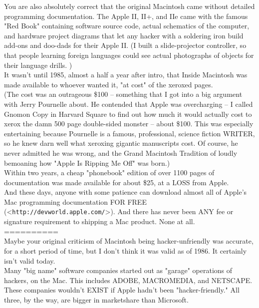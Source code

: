 \documentclass[11pt,twoside,a4paper]{article}
\begin{document}
\begin{multicols*}{2}
You are also absolutely correct that the original Macintosh came without detailed programming documentation. The Apple II, II+, and IIe came with the famous "Red Book" containing software source code, actual schematics of the computer, and hardware project diagrams that let any hacker with a soldering iron build add-ons and doo-dads for their Apple II. (I built a slide-projector controller, so that people learning foreign languages could see actual photographs of objects for their language drills. )~\\

It wasn't until 1985, almost a half a year after intro, that Inside Macintosh was made available to whoever wanted it, "at cost" of the xeroxed pages.~\\

(The cost was an outrageous \$100 -- something that I got into a big argument with Jerry Pournelle about. He contended that Apple was overcharging -- I called Gnomon Copy in Harvard Square to find out how much it would actually cost to xerox the damn 500 page double-sided monster -- about \$100. This was especially entertaining because Pournelle is a famous, professional, science fiction WRITER, so he knew darn well what xeroxing gigantic manuscripts cost. Of course, he never admitted he was wrong, and the Grand Macintosh Tradition of loudly bemoaning how "Apple Is Ripping Me Off" was born.)~\\

Within two years, a cheap "phonebook" edition of over 1100 pages of documentation was made available for about \$25, at a LOSS from Apple.~\\

And these days, anyone with some patience can download almost all of Apple's Mac programming documentation FOR FREE (<\texttt{http://devworld.apple.com/}>). And there has never been ANY fee or signature requirement to shipping a Mac product. None at all.~\\

==========~\\
Maybe your original criticism of Macintosh being hacker-unfriendly was accurate, for a short period of time, but I don't think it was valid as of 1986. It certainly isn't valid today.~\\

Many "big name" software companies started out as "garage" operations of hackers, on the Mac. This includes ADOBE, MACROMEDIA, and NETSCAPE. These companies wouldn't EXIST if Apple hadn't been "hacker-friendly." All three, by the way, are bigger in marketshare than Microsoft.~\\


\end{multicols*}
\end{document}
